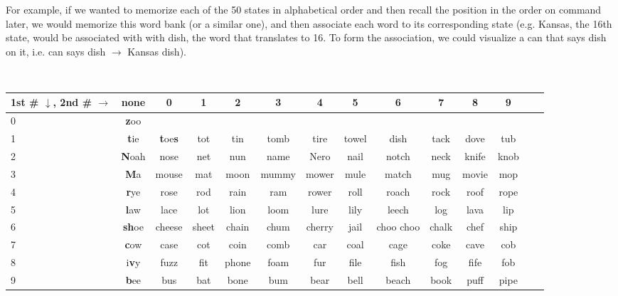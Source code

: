 \documentclass{article}
\newcommand{\mt}[1]{\ensuremath{#1}}
\newcommand{\lra}{ \mt{\longrightarrow} } %
\begin{document}
{{For example, if we wanted to memorize each of the 50 states in alphabetical order and then recall the position in the order on command later, we would memorize this word bank (or a similar one), and then associate each word to its corresponding state (e.g. Kansas, the 16th state, would be associated with with dish, the word that translates to 16. To form the association, we could visualize a can that says dish on it, i.e. can says dish \lra Kansas dish).

\

\begin{tabular}{l|ccccccccccccc}
 1st \# $\downarrow$, 2nd \# $\rightarrow$ & none & 0 & 1 & 2 & 3 & 4 & 5 & 6 & 7 & 8 & 9 \\
  \hline
  0 & \textbf{z}oo & \\
  1 & \textbf{t}ie & \textbf{t}oe\textbf{s} &  tot & tin & tomb & tire & towel & dish & tack & dove & tub \\
  2 & \textbf{N}oah & nose & net & nun & name & Nero & nail & notch & neck & knife & knob \\
  3 & \textbf{M}a & mouse & mat & moon & mummy & mower & mule & match & mug & movie & mop \\
  4 & \textbf{r}ye & rose & rod & rain & ram & rower & roll & roach & rock & roof & rope \\
  5 & \textbf{l}aw & lace & lot & lion & loom & lure & lily & leech & log & lava & lip \\
  6 & \textbf{sh}oe & cheese & sheet & chain & chum & cherry & jail & choo choo & chalk & chef & ship \\
  7 & \textbf{c}ow & case & cot & coin & comb & car & coal & cage & coke & cave & cob \\
  8 & i\textbf{v}y & fuzz & fit & phone & foam & fur & file & fish & fog & fife & fob\\
  9 & \textbf{b}ee & bus & bat & bone & bum & bear & bell & beach & book & puff & pipe
\end{tabular}

}

}
\end{document}
